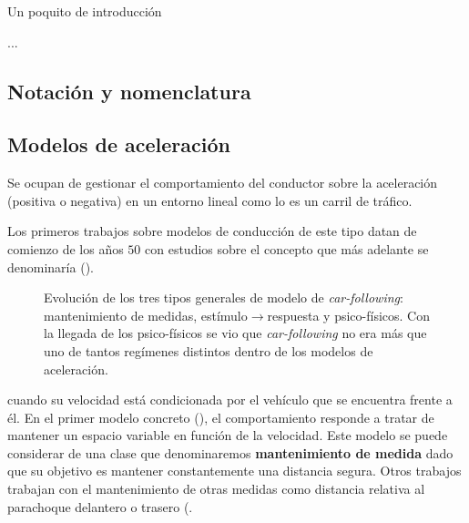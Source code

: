\newthought{}

Un poquito de introducción













...











\subsection{Notación y nomenclatura}


\subsection{Modelos de aceleración}

Se ocupan de gestionar el comportamiento del conductor sobre la aceleración (positiva o negativa) en un entorno lineal como lo es un carril de tráfico.

Los primeros trabajos sobre modelos de conducción de este tipo datan de comienzo de los años $50$ con estudios sobre el concepto que más adelante se denominaría \textit{} (\cite{reuschel1950fahrzeugbewegungen, Pipes1953}).

\begin{figure}
	\centering
	\caption{Evolución de los tres tipos generales de modelo de \textit{car-following}: mantenimiento de medidas, estímulo$\rightarrow$respuesta y psico-físicos. Con la llegada de los psico-físicos se vio que \textit{car-following} no era más que uno de tantos regímenes distintos dentro de los modelos de aceleración.}
	\label{fig:car-following-there-different-models}
\end{figure}

 cuando su velocidad está condicionada por el vehículo que se encuentra frente a él. En el primer modelo concreto (\cite{Pipes1953}), el comportamiento responde a tratar de mantener un espacio variable en función de la velocidad. Este modelo se puede considerar de una clase que denominaremos \textbf{mantenimiento de medida} dado que su objetivo es mantener constantemente una distancia segura. Otros trabajos trabajan con el mantenimiento de otras medidas como distancia relativa al parachoque delantero o trasero (.


